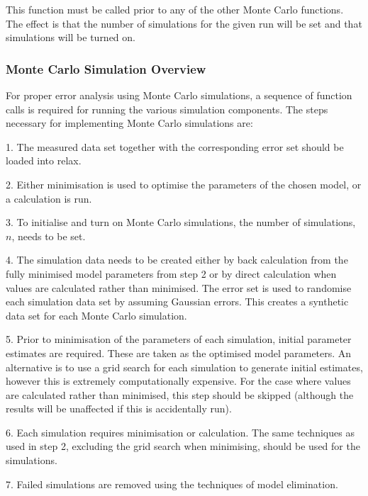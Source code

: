 This function must be called prior to any of the other Monte Carlo functions.  The effect is
that the number of simulations for the given run will be set and that simulations will be
turned on.



\subsubsection{Monte Carlo Simulation Overview}

For proper error analysis using Monte Carlo simulations, a sequence  of function calls is
required for running the various simulation components.  The steps necessary for
implementing Monte Carlo simulations are:

1.  The measured data set together with the corresponding error set should be loaded into
relax.

2.  Either minimisation  is used to optimise  the parameters of the chosen model, or a
calculation is run.

3.  To initialise and turn on Monte Carlo simulations, the number of simulations, $n$, needs
to be set.

4.  The simulation data needs to be created either by back calculation from the fully
minimised  model parameters from step 2 or by direct calculation when values are calculated
rather than minimised.   The error set is used to randomise each simulation data set by
assuming Gaussian errors.  This creates a synthetic data set for each Monte Carlo
simulation.

5.  Prior to minimisation  of the parameters of each simulation, initial parameter estimates
are required.  These are taken as the optimised  model parameters.  An alternative is to use
a grid search for each simulation to generate initial estimates, however this is extremely
computationally expensive.  For the case where values are calculated rather than minimised, 
this step should be skipped (although the results will be unaffected if this is accidentally
run).

6.  Each simulation requires minimisation  or calculation.  The same techniques as used in
step 2, excluding the grid search when minimising, should be used for the simulations.

7.  Failed simulations are removed using the techniques of model elimination.  

